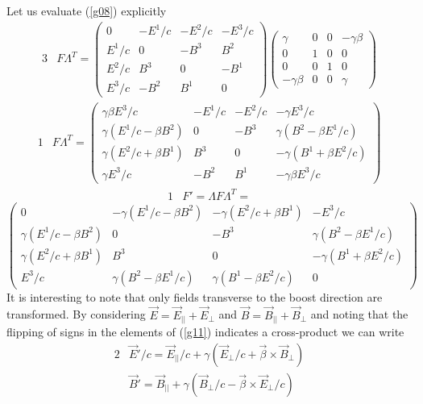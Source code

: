 \documentclass[]{article}
\numberwithin{equation}{subsection}
\begin{document}
Let us evaluate (\ref{g08}) explicitly
\begin{alignat}{3}
	\label{g09}	&F\Lambda^{T}=
	\begin{pmatrix}
		0&-E^{1}/c&-E^{2}/c&-E^{3}/c\\
		E^{1}/c&0&-B^{3}&B^{2}\\
		E^{2}/c&B^{3}&0&-B^{1}\\
		E^{3}/c&-B^{2}&B^{1}&0	
	\end{pmatrix}
	\begin{pmatrix}
		\gamma&0&0&-\gamma\beta\\
		0&1&0&0\\
		0&0&1&0\\
		-\gamma\beta&0&0&\gamma
	\end{pmatrix}
\end{alignat}
\begin{alignat}{1}
	\label{g10}	&F\Lambda^{T}=
	\begin{pmatrix}
		\gamma\beta E^{3}/c&-E^{1}/c&-E^{2}/c&-\gamma E^{3}/c\\
		\gamma(E^{1}/c-\beta B^{2})&0&-B^{3}&\gamma(B^{2}-\beta E^{1}/c)\\
		\gamma(E^{2}/c+\beta B^{1})&B^{3}&0&-\gamma(B^{1}+\beta E^{2}/c)\\
		\gamma E^{3}/c&-B^{2}&B^{1}&-\gamma\beta E^{3}/c
	\end{pmatrix}
\end{alignat}
\begin{alignat}{1}
	\label{g11}	&F'=\Lambda F\Lambda^{T}=
\end{alignat}
$$
	\begin{pmatrix}
		0&-\gamma(E^{1}/c-\beta B^{2})&-\gamma(E^{2}/c+\beta B^{1})&-E^{3}/c\\
		\gamma(E^{1}/c-\beta B^{2})&0&-B^{3}&\gamma(B^{2}-\beta E^{1}/c)\\
		\gamma(E^{2}/c+\beta B^{1})&B^{3}&0&-\gamma(B^{1}+\beta E^{2}/c)\\
		E^{3}/c&\gamma(B^{2}-\beta E^{1}/c)&\gamma(B^{1}-\beta E^{2}/c)&0
	\end{pmatrix}
$$
It is interesting to note that only fields transverse to the boost direction are transformed. By considering $\vec{E}=\vec{E}_{||}+\vec{E}_{\perp}$ and $\vec{B}=\vec{B}_{||}+\vec{B}_{\perp}$ and noting that the flipping of signs in the elements of (\ref{g11}) indicates a cross-product we can write
\begin{alignat}{2}
	\label{g12}	&\vec{E}'/c=\vec{E}_{||}/c+\gamma(\vec{E}_{\perp}/c+\vec{\beta}\times\vec{B}_{\perp})\\
	\label{g13}	&\vec{B}'=\vec{B}_{||}+\gamma(\vec{B}_{\perp}/c-\vec{\beta}\times\vec{E}_{\perp}/c)
\end{alignat}
\end{document}
